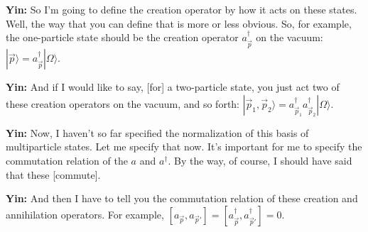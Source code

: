 \noindent\textbf{Yin:} So I'm going to define the creation operator by how it acts on these states. Well, the way that you can define that is more or less obvious. So, for example, the one-particle state should be the creation operator $a^\dagger_{\vec p}$ on the vacuum: $|\vec p\rangle=a^\dagger_{\vec p}|\Omega\rangle$.\par

\noindent\textbf{Yin:} And if I would like to say, [for] a two-particle state, you just act two of these creation operators on the vacuum, and so forth: $|\vec p_1,\vec p_2\rangle=a^\dagger_{\vec p_1}a^\dagger_{\vec p_2}|\Omega\rangle$.\par

\noindent\textbf{Yin:} Now, I haven't so far specified the normalization of this basis of multiparticle states. Let me specify that now. It's important for me to specify the commutation relation of the $a$ and $a^\dagger$. By the way, of course, I should have said that these [commute].\par

\noindent\textbf{Yin:} And then I have to tell you the commutation relation of these creation and annihilation operators. For example, $[a_{\vec p},a_{\vec p'}]=[a^\dagger_{\vec p},a^\dagger_{\vec p'}]=0$.\par


